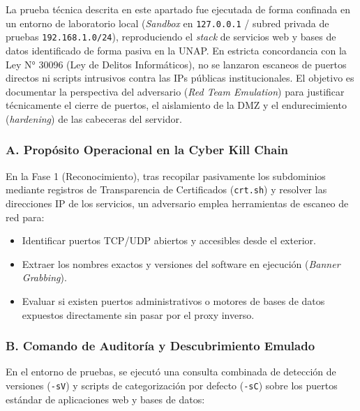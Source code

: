 \begin{tcolorbox}[
    colback=orange!8!white,
    colframe=orange!85!black,
    arc=2mm,
    boxrule=0.9pt,
    title={\textbf{NOTA METODOLÓGICA DE AUDITORÍA DEFENSIVA}},
    fonttitle=\small\sffamily\bfseries,
    coltitle=white
]
\small
La prueba técnica descrita en este apartado fue ejecutada de forma confinada en un entorno de laboratorio local (\textit{Sandbox} en \texttt{127.0.0.1} / subred privada de pruebas \texttt{192.168.1.0/24}), reproduciendo el \textit{stack} de servicios web y bases de datos identificado de forma pasiva en la UNAP. En estricta concordancia con la Ley N° 30096 (Ley de Delitos Informáticos), no se lanzaron escaneos de puertos directos ni scripts intrusivos contra las IPs públicas institucionales. El objetivo es documentar la perspectiva del adversario (\textit{Red Team Emulation}) para justificar técnicamente el cierre de puertos, el aislamiento de la DMZ y el endurecimiento (\textit{hardening}) de las cabeceras del servidor.
\end{tcolorbox}

\subsubsection*{A. Propósito Operacional en la Cyber Kill Chain}

En la Fase 1 (Reconocimiento), tras recopilar pasivamente los subdominios mediante registros de Transparencia de Certificados (\texttt{crt.sh}) y resolver las direcciones IP de los servicios, un adversario emplea herramientas de escaneo de red para:

\begin{itemize}
    \item Identificar puertos TCP/UDP abiertos y accesibles desde el exterior.
    \item Extraer los nombres exactos y versiones del software en ejecución (\textit{Banner Grabbing}).
    \item Evaluar si existen puertos administrativos o motores de bases de datos expuestos directamente sin pasar por el proxy inverso.
\end{itemize}

\subsubsection*{B. Comando de Auditoría y Descubrimiento Emulado}

En el entorno de pruebas, se ejecutó una consulta combinada de detección de versiones (\texttt{-sV}) y scripts de categorización por defecto (\texttt{-sC}) sobre los puertos estándar de aplicaciones web y bases de datos:

